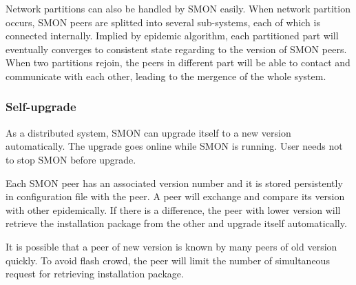 Network partitions can also be handled by SMON easily. When
network partition occurs, SMON peers are splitted into
several sub-systems, each of which is connected internally.
Implied by epidemic algorithm, each partitioned part will
eventually converges to consistent state regarding to
the version of SMON peers. When two partitions rejoin, the
peers in different part will be able to contact and
communicate with each other, leading to the mergence of
the whole system.



\subsubsection*{Self-upgrade}

As a distributed system, SMON can upgrade itself to a new
version automatically. The upgrade goes online while SMON is
running. User needs not to stop SMON before upgrade.

Each SMON peer has an associated version number and it is
stored persistently in configuration file with the peer.  A
peer will exchange and compare its version with other epidemically. If
there is a difference, the peer with lower version will
retrieve the installation package from the other and upgrade
itself automatically.

It is possible that a peer of new version is known by many
peers of old version quickly. To avoid flash crowd, the peer
will limit the number of simultaneous request for retrieving
installation package.

